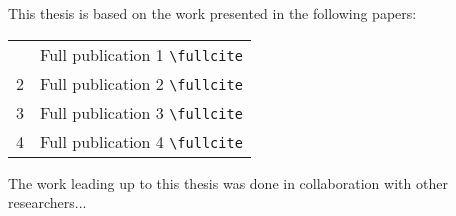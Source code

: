 
\par
\vspace{1cm}

This thesis is based on the work presented in the following papers:

{\setlength{\parindent}{0.16cm}
\begin{tabulary}{\textwidth}{JJ}
\noindent
{} & Full publication 1 \verb|\fullcite|\\
2 & Full publication 2 \verb|\fullcite|\\
3 & Full publication 3 \verb|\fullcite|\\
4 & Full publication 4 \verb|\fullcite|\\
\end{tabulary}
}

\clearpage

\par
\vspace{1cm}

The work leading up to this thesis was done in collaboration with other researchers...

\par
\cleardoublepage

